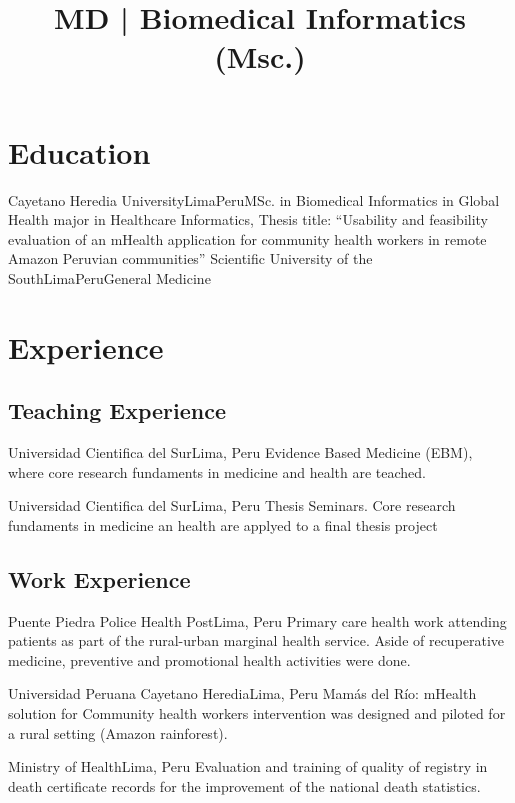 \documentclass[11pt,a4paper,sans]{moderncv}
\title{MD | Biomedical Informatics (Msc.) }
\begin{document}
\makecvtitle

\section{Education}

{Cayetano Heredia University}{Lima}{Peru}{MSc. in Biomedical Informatics in Global Health major in Healthcare Informatics, Thesis title: “Usability and feasibility evaluation of an mHealth application for community health workers in remote Amazon Peruvian communities”}
{Scientific University of the South}{Lima}{Peru}{General Medicine}  

\section{Experience}
    \subsection{Teaching Experience}
        {Universidad Cientifica del Sur}{Lima, Peru}{}
        {Evidence Based Medicine (EBM), where core research fundaments in medicine and health are teached.}
        
        {Universidad Cientifica del Sur}{Lima, Peru}{}
        {Thesis Seminars. Core research fundaments in medicine an health are applyed to a final thesis project}
        
    \subsection{Work Experience}
        {Puente Piedra Police Health Post}{Lima, Peru}{}
        {Primary care health work attending patients as part of the rural-urban marginal health service. Aside of recuperative medicine, preventive and promotional health activities were done.}
        
        {Universidad Peruana Cayetano Heredia}{Lima, Peru}{}
        {Mamás del Río: mHealth solution for Community health workers intervention was designed and piloted for a rural setting (Amazon rainforest).}
        
        {Ministry of Health}{Lima, Peru}{}
        {Evaluation and training of quality of registry in death certificate records for the improvement of the national death statistics.} 
        
\end{document}
